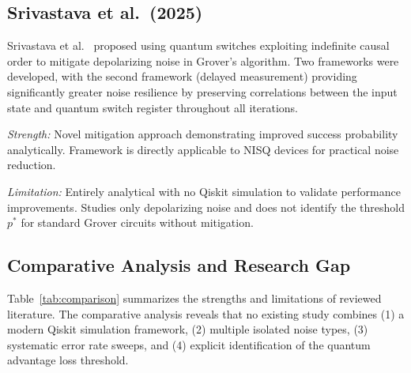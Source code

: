 \documentclass[conference]{IEEEtran}
\begin{document}
\subsection{Srivastava et al.\ (2025)}

Srivastava et al.~\cite{srivastava2025} proposed using quantum switches exploiting
indefinite causal order to mitigate depolarizing noise in Grover's algorithm. Two
frameworks were developed, with the second framework (delayed measurement)
providing significantly greater noise resilience by preserving correlations between
the input state and quantum switch register throughout all iterations.

\textit{Strength:} Novel mitigation approach demonstrating improved success
probability analytically. Framework is directly applicable to NISQ devices for
practical noise reduction.

\textit{Limitation:} Entirely analytical with no Qiskit simulation to validate
performance improvements. Studies only depolarizing noise and does not identify
the threshold $p^{*}$ for standard Grover circuits without mitigation.

\subsection{Comparative Analysis and Research Gap}

Table~\ref{tab:comparison} summarizes the strengths and limitations of reviewed
literature. The comparative analysis reveals that no existing study combines
(1) a modern Qiskit simulation framework, (2) multiple isolated noise types,
(3) systematic error rate sweeps, and (4) explicit identification of the quantum
advantage loss threshold.

\begin{table}[htbp]
  \centering
  \caption{Comparative Analysis of Related Work}
  \label{tab:comparison}
\end{table}
\end{document}
